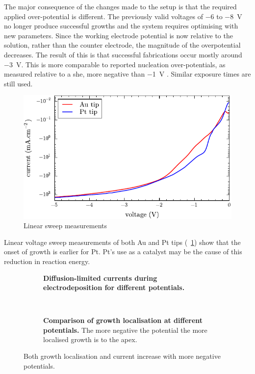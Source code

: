 \documentclass{article}
\begin{document}
The major consequence of the changes made to the setup is that the required applied over-potential is different. The previously valid voltages of $-6$ to \SI{-8}{V} no longer produce successful growths and the system requires optimising with new parameters. Since the working electrode potential is now relative to the solution, rather than the counter electrode, the magnitude of the overpotential decreases. The result of this is that successful fabrications occur mostly around \SI{-3}{V}. This is more comparable to reported nucleation over-potentials, as measured relative to a \gls{she}, more negative than \SI{-1}{V} \cite{}. Similar exposure times are still used.

\begin{figure}[bt]
\centering
\includegraphics{figures/linear_sweep_measurements}
\caption[]{Linear sweep measurements}
\label{fig:linear_sweeps}
\end{figure}

Linear voltage sweep measurements of both Au and Pt tips (\figurename~\ref{fig:linear_sweeps}) show that the onset of growth is earlier for Pt. Pt's use as a catalyst may be the cause of this reduction in reaction energy.

\begin{figure}[h]
\centering
\begin{subfigure}[t]{0.48\textwidth}
\caption[Diffusion-limited currents during electrodeposition for different potentials.]{\textbf{Diffusion-limited currents during electrodeposition for different potentials.}}
\label{fig:voltage_saturation_current}
\end{subfigure}
\ \
\begin{subfigure}[t]{0.48\textwidth}
\caption[Comparison of growth localisation at different potentials.]{\textbf{Comparison of growth localisation at different potentials.} The more negative the potential the more localised growth is to the apex.}
\label{fig:growth_localisation}
\end{subfigure}
\caption{Both growth localisation and current increase with more negative potentials.}
\end{figure}
\end{document}

